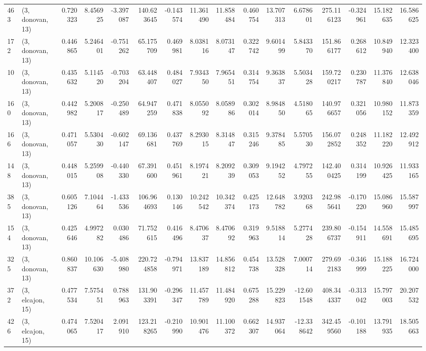 \begin{tabular}{llrrrrrrrrrrrrrr}
463 &  (3, donovan, 13) &   0.720323 &   8.456925 &  -3.397087 &   140.623645 &  -0.143574 &  11.361490 &  11.858484 &  0.460754 &  13.707313 &   6.678601 &   275.116123 & -0.324961 &  15.182635 &  16.586625 \\
172 &  (3, donovan, 13) &   0.446865 &   5.246401 &  -0.751262 &    65.175709 &   0.469981 &   8.038116 &   8.073147 &  0.322742 &   9.601499 &   5.843370 &   151.866177 &  0.268612 &  10.849940 &  12.323400 \\
10  &  (3, donovan, 13) &   0.435632 &   5.114520 &  -0.703204 &    63.448407 &   0.484027 &   7.934350 &   7.965451 &  0.314754 &   9.363837 &   5.503428 &   159.720217 &  0.230787 &  11.376840 &  12.638046 \\
160 &  (3, donovan, 13) &   0.442982 &   5.200817 &  -0.250489 &    64.947259 &   0.471838 &   8.055092 &   8.058986 &  0.302014 &   8.984850 &   4.518065 &   140.976657 &  0.321056 &  10.980152 &  11.873359 \\
166 &  (3, donovan, 13) &   0.471057 &   5.530430 &  -0.602147 &    69.136681 &   0.437769 &   8.293015 &   8.314847 &  0.315246 &   9.378485 &   5.570530 &   156.072852 &  0.248352 &  11.182220 &  12.492912 \\
148 &  (3, donovan, 13) &   0.448015 &   5.259908 &  -0.440330 &    67.391600 &   0.451961 &   8.197421 &   8.209239 &  0.309053 &   9.194252 &   4.797255 &   142.400425 &  0.314199 &  10.926425 &  11.933165 \\
385 &  (3, donovan, 13) &   0.605126 &   7.104464 &  -1.433536 &   106.964693 &   0.130146 &  10.242542 &  10.342374 &  0.425173 &  12.648782 &   3.920368 &   242.985641 & -0.170220 &  15.086960 &  15.587997 \\
154 &  (3, donovan, 13) &   0.425646 &   4.997282 &   0.030486 &    71.752615 &   0.416496 &   8.470637 &   8.470692 &  0.319963 &   9.518814 &   5.277428 &   239.806737 & -0.154911 &  14.558691 &  15.485695 \\
325 &  (3, donovan, 13) &   0.860837 &  10.106630 &  -5.408980 &   220.724858 &  -0.794971 &  13.837189 &  14.856812 &  0.454738 &  13.528328 &   7.000714 &   279.692183 & -0.346999 &  15.188225 &  16.724000 \\
372 &  (3, elcajon, 15) &   0.477534 &   7.575451 &   0.788963 &   131.903391 &  -0.296347 &  11.457789 &  11.484920 &  0.675288 &  15.229823 & -12.601548 &   408.344337 & -0.313042 &  15.797003 &  20.207532 \\
426 &  (3, elcajon, 15) &   0.474065 &   7.520417 &   2.091910 &   123.218265 &  -0.210990 &  10.901476 &  11.100372 &  0.662307 &  14.937064 & -12.338642 &   342.459560 & -0.101188 &  13.791935 &  18.505663 \\

\end{tabular}
